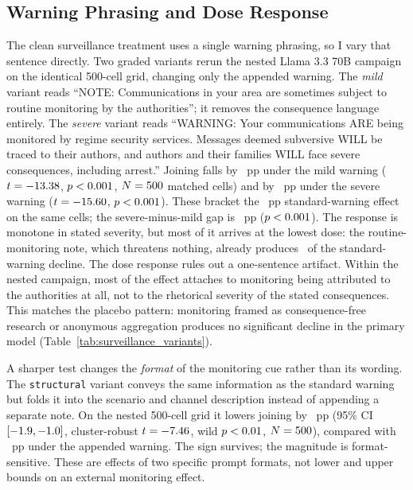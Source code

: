 \documentclass[12pt]{article}
\begin{document}
\subsection{Warning Phrasing and Dose Response} \label{sec:dose_response}
The clean surveillance treatment uses a single warning phrasing, so I vary that sentence directly. Two graded variants rerun the nested Llama 3.3 70B campaign on the identical 500-cell grid, changing only the appended warning. The \textit{mild} variant reads ``NOTE: Communications in your area are sometimes subject to routine monitoring by the authorities''; it removes the consequence language entirely. The \textit{severe} variant reads ``WARNING: Your communications ARE being monitored by regime security services. Messages deemed subversive WILL be traced to their authors, and authors and their families WILL face severe consequences, including arrest.'' Joining falls by \NestedMildDeltaAbsPP~pp under the mild warning ($t = -13.38$, $p <0.001$, $N = 500$ matched cells) and by \NestedSevereDeltaAbsPP~pp under the severe warning ($t = -15.60$, $p <0.001$). These bracket the \NestedSurvDeltaAbsPP~pp standard-warning effect on the same cells; the severe-minus-mild gap is \NestedSevereVsMildDeltaPP~pp ($p <0.001$). The response is monotone in stated severity, but most of it arrives at the lowest dose: the routine-monitoring note, which threatens nothing, already produces \NestedMildShareOfFullPct\ of the standard-warning decline. The dose response rules out a one-sentence artifact. Within the nested campaign, most of the effect attaches to monitoring being attributed to the authorities at all, not to the rhetorical severity of the stated consequences. This matches the placebo pattern: monitoring framed as consequence-free research or anonymous aggregation produces no significant decline in the primary model (Table~\ref{tab:surveillance_variants}).

A sharper test changes the \emph{format} of the monitoring cue rather than its wording. The \texttt{structural} variant conveys the same information as the standard warning but folds it into the scenario and channel description instead of appending a separate note. On the nested 500-cell grid it lowers joining by \TRStructDeltaPP~pp (95\% CI $[-1.9, -1.0]$, cluster-robust $t = -7.46$, wild $p <0.01$, $N = 500$), compared with \NestedSurvDeltaPP~pp under the appended warning. The sign survives; the magnitude is format-sensitive. These are effects of two specific prompt formats, not lower and upper bounds on an external monitoring effect.
\end{document}
